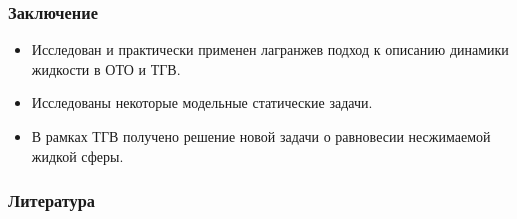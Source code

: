 \documentclass[compress]{beamer}
\providecommand{\docroot}{../..}
\begin{document}

    \begin{frame}\frametitle{Заключение}

        \begin{itemize}
            \item Исследован и практически применен лагранжев подход к описанию динамики жидкости в ОТО и ТГВ.
            \item Исследованы некоторые модельные статические задачи.
            \item В рамках ТГВ получено решение новой задачи о равновесии несжимаемой жидкой сферы.
        \end{itemize}

    \end{frame}


    \begin{frame}\frametitle{Литература}

        {\tiny{
        
        
        }}

    \end{frame}
\end{document}
